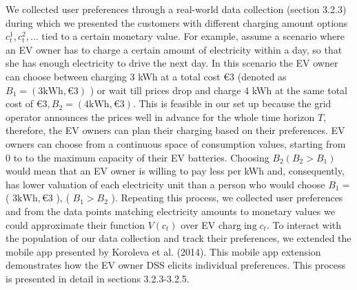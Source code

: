 \documentclass[10pt]{article}
\begin{document}
We collected user preferences through a real-world data collection (section 3.2.3) during which we presented the customers with different charging amount options $c_{t}^{1}, c_{t}^{2}, \ldots$ tied to a certain monetary value. For example, assume a scenario where an EV owner has to charge a certain amount of electricity within a day, so that she has enough electricity to drive the next day. In this scenario the EV owner can choose between charging 3 kWh at a total cost $€ 3$ (denoted as $B_{1}=(3 \mathrm{kWh}, € 3)$ ) or wait till prices drop and charge 4 kWh at the same total cost of $€ 3, B_{2}=(4 \mathrm{kWh}, € 3)$. This is feasible in our set up because the grid operator announces the prices well in advance for the whole time horizon $T$, therefore, the EV owners can plan their charging based on their preferences. EV owners can choose from a continuous space of consumption values, starting from 0 to to the maximum capacity of their EV batteries. Choosing $B_{2}\left(B_{2}>B_{1}\right)$ would mean that an EV owner is willing to pay less per kWh and, consequently, has lower valuation of each electricity unit than a person who would choose $B_{1}=$ ( $3 \mathrm{kWh}, € 3$ ), ( $B_{1}>B_{2}$ ). Repeating this process, we collected user preferences and from the data points matching electricity amounts to monetary values we could approximate their function $V\left(c_{t}\right)$ over EV charg$\operatorname{ing} c_{t}$. To interact with the population of our data collection and track their preferences, we extended the mobile app presented by Koroleva et al. (2014). This mobile app extension demonstrates how the EV owner DSS elicits individual preferences. This process is presented in detail in sections 3.2.3-3.2.5.
\end{document}
